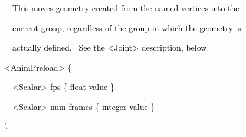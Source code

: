 \documentclass[a4paper]{article}
\newcommand\textstyleOOoComputerKeyWord[1]{\textrm{\textcolor[rgb]{0.0,0.0,0.5019608}{#1}}}
\newcommand\textstyleOOoAssemblerSpecialChar[1]{\textrm{\textcolor[rgb]{0.0,0.5019608,0.0}{#1}}}
\newcommand\textstyleOOoAssemblerIdent[1]{\textrm{\textcolor{black}{#1}}}
\begin{document}
\bigskip

{\color{black}
\textstyleOOoComputerKeyWord{\textcolor{black}{\ \ \ \ This moves geometry created from the named vertices into the}}}

{\color{black}
\textstyleOOoComputerKeyWord{\textcolor{black}{\ \ \ \ current group, regardless of the group in which the geometry
is}}}

{\color{black}
\textstyleOOoComputerKeyWord{\textcolor{black}{\ \ \ \ actually defined. \ See the {\textless}Joint{\textgreater}
description, below.}}}


\bigskip

{\color{black}
\textstyleOOoComputerKeyWord{\textcolor{black}{\ \ }}\textstyleOOoAssemblerSpecialChar{{\textless}}\textstyleOOoAssemblerIdent{AnimPreload}\textstyleOOoAssemblerSpecialChar{{\textgreater}}\textstyleOOoComputerKeyWord{\textcolor{black}{
}}\textstyleOOoAssemblerSpecialChar{\{}\textstyleOOoComputerKeyWord{\textcolor{black}{ }}}

{\color{black}
\textstyleOOoComputerKeyWord{\textcolor{black}{\ \ \ \ }}\textstyleOOoAssemblerSpecialChar{{\textless}}\textstyleOOoAssemblerIdent{Scalar}\textstyleOOoAssemblerSpecialChar{{\textgreater}}\textstyleOOoComputerKeyWord{\textcolor{black}{
}}\textstyleOOoAssemblerIdent{fps}\textstyleOOoComputerKeyWord{\textcolor{black}{
}}\textstyleOOoAssemblerSpecialChar{\{}\textstyleOOoComputerKeyWord{\textcolor{black}{
}}\textstyleOOoAssemblerIdent{float}\textstyleOOoAssemblerSpecialChar{{}-}\textstyleOOoAssemblerIdent{value}\textstyleOOoComputerKeyWord{\textcolor{black}{
}}\textstyleOOoAssemblerSpecialChar{\}}}

{\color{black}
\textstyleOOoComputerKeyWord{\textcolor{black}{\ \ \ \ }}\textstyleOOoAssemblerSpecialChar{{\textless}}\textstyleOOoAssemblerIdent{Scalar}\textstyleOOoAssemblerSpecialChar{{\textgreater}}\textstyleOOoComputerKeyWord{\textcolor{black}{
}}\textstyleOOoAssemblerIdent{num}\textstyleOOoAssemblerSpecialChar{{}-}\textstyleOOoAssemblerIdent{frames}\textstyleOOoComputerKeyWord{\textcolor{black}{
}}\textstyleOOoAssemblerSpecialChar{\{}\textstyleOOoComputerKeyWord{\textcolor{black}{
}}\textstyleOOoAssemblerIdent{integer}\textstyleOOoAssemblerSpecialChar{{}-}\textstyleOOoAssemblerIdent{value}\textstyleOOoComputerKeyWord{\textcolor{black}{
}}\textstyleOOoAssemblerSpecialChar{\}}\textstyleOOoComputerKeyWord{\textcolor{black}{ }}}

{\color{black}
\textstyleOOoComputerKeyWord{\textcolor{black}{\ \ }}\textstyleOOoAssemblerSpecialChar{\}}}
\end{document}
